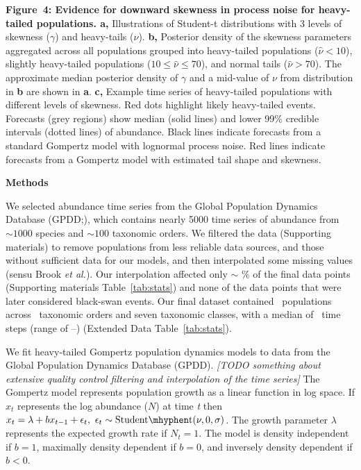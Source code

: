 \textbf{Figure~4: Evidence for downward skewness in process noise for heavy-tailed populations. a,} Illustrations of Student-t distributions with 3 levels of skewness (\(\gamma\)) and heavy-tails (\(\nu\)). \textbf{b,} Posterior density of the skewness parameters aggregated across all populations grouped into heavy-tailed populations (\(\hat{\nu} < 10\)), slightly heavy-tailed populations (\(10 \leq \hat{\nu} \leq 70\)), and normal tails (\(\hat{\nu} > 70\)). The approximate median posterior density of \(\gamma\) and a mid-value of \(\nu\) from distribution in \textbf{b} are shown in \textbf{a}. \textbf{c,} Example time series of heavy-tailed populations with different levels of skewness. Red dots highlight likely heavy-tailed events. Forecasts (grey regions) show median (solid lines) and lower 99\% credible intervals (dotted lines) of abundance. Black lines indicate forecasts from a standard Gompertz model with lognormal process noise. Red lines indicate forecasts from a Gompertz model with estimated tail shape and skewness.

\clearpage

\textbf{Methods}

We selected abundance time series from the Global Population Dynamics Database (GPDD;\cite{gpdd2010}), which contains nearly 5000 time series of abundance from \(\sim 1000\) species and \(\sim 100\) taxonomic orders. We filtered the data (Supporting materials) to remove populations from less reliable data sources, and those without sufficient data for our models, and then interpolated some missing values (sensu Brook \textit{et al.}\cite{brook2006a}). Our interpolation affected only \(\sim\) \interpPointsPerc \% of the final data points (Supporting materials Table~\ref{tab:stats}) and none of the data points that were later considered black-swan events. Our final dataset contained \NPops\ populations across \NOrders\ taxonomic orders and seven taxonomic classes, with a median of \medianTimeSteps\ time steps (range of \minTimeSteps--\maxTimeSteps) (Extended Data Table~\ref{tab:stats}).

We fit heavy-tailed Gompertz population dynamics models to data from the Global Population Dynamics Database (GPDD). \emph{{[}TODO something about extensive quality control filtering and interpolation of the time series{]}} The Gompertz model represents population growth as a linear function in log space. If \(x_{t}\) represents the log abundance (\(N\)) at time \emph{t} then \(x_t = \lambda + bx_{t - 1} + \epsilon_t,\ \epsilon_t \sim \mathrm{Student\mhyphen t}(\nu, 0, \sigma)\). The growth parameter \(\lambda\) represents the expected growth rate if \(N_{t} = 1\). The model is density independent if \(b = 1\), maximally density dependent if \(b = 0\), and inversely density dependent if \(b < 0\).


